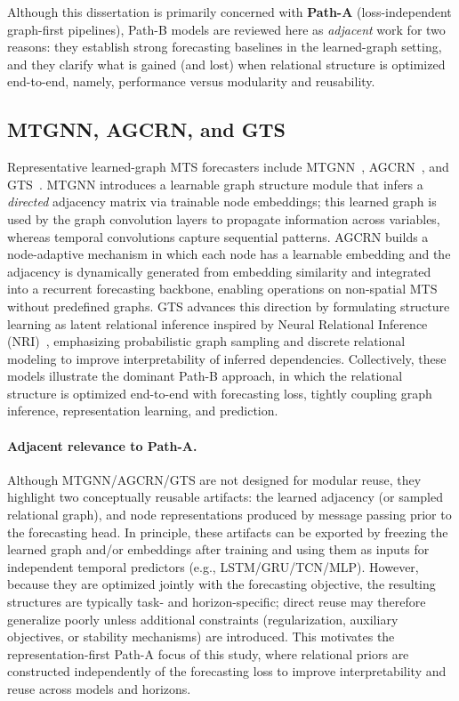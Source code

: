 Although this dissertation is primarily concerned with \textbf{Path-A} (loss-independent graph-first pipelines), Path-B
models are reviewed here as \emph{adjacent} work for two reasons:   they establish strong forecasting baselines in the
learned-graph setting, and they clarify what is gained (and lost) when relational structure is optimized end-to-end,
namely, performance versus modularity and reusability.

\subsection{MTGNN, AGCRN, and GTS}
\label{sec:pathb-mtgnn-agcrn-gts}

Representative learned-graph MTS forecasters include MTGNN~\cite{wu2020connectingdotsmultivariatetime},
AGCRN~\cite{bai2020adaptivegraphconvolutionalrecurrent}, and GTS~\cite{shang2021discretegraphstructurelearning}.
MTGNN introduces a learnable graph structure module that infers a \emph{directed} adjacency matrix via trainable node
embeddings; this learned graph is used by the graph convolution layers to propagate information across variables, whereas temporal convolutions capture sequential patterns. AGCRN builds a node-adaptive mechanism in which each node has a
learnable embedding and the adjacency is dynamically generated from embedding similarity and integrated into a recurrent
forecasting backbone, enabling operations on non-spatial MTS without predefined graphs. GTS advances this direction by
formulating structure learning as latent relational inference inspired by Neural Relational Inference (NRI)~\cite{kipf2018nri},
emphasizing probabilistic graph sampling and discrete relational modeling to improve interpretability of inferred
dependencies. Collectively, these models illustrate the dominant Path-B approach, in which the relational structure is optimized end-to-end with forecasting loss, tightly coupling graph inference, representation learning, and prediction.

\paragraph{Adjacent relevance to Path-A.}
Although MTGNN/AGCRN/GTS are not designed for modular reuse, they highlight two conceptually reusable artifacts:
the learned adjacency (or sampled relational graph), and node representations produced by message passing prior
to the forecasting head. In principle, these artifacts can be exported by freezing the learned graph and/or embeddings
after training and using them as inputs for independent temporal predictors (e.g., LSTM/GRU/TCN/MLP). However, because they are optimized jointly with the forecasting objective, the resulting structures are typically task- and horizon-specific; direct reuse may therefore generalize poorly unless additional constraints (regularization, auxiliary objectives, or stability
mechanisms) are introduced. This motivates the representation-first Path-A focus of this study, where relational priors are constructed independently of the forecasting loss to improve interpretability and reuse across models and horizons.

